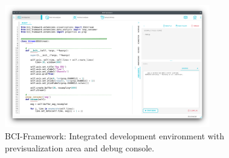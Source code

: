 \begin{figure}
\begin{centering}
\includegraphics[width=0.8\textwidth]{Cap4/Figures/development_environment.png}
\par\end{centering}
\caption[BCI-Framework: integrated development environment]{BCI-Framework: Integrated development environment with previsualization area and debug console.}
\label{fig:development_environment}
\end{figure}